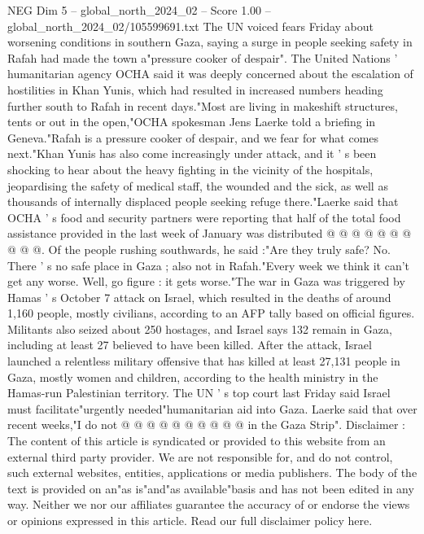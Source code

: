 \begin{textsample}{NEG Dim 5 – global\_north\_2024\_02 – Score 1.00 – global\_north\_2024\_02/105599691.txt}  \label{ex:f5_neg_217}
The UN voiced fears Friday about worsening conditions in southern Gaza, saying a surge in people seeking safety in Rafah had made the town a"pressure cooker of despair".
The United Nations ' humanitarian agency OCHA said it was deeply concerned about the escalation of hostilities in Khan Yunis, which had resulted in increased numbers heading further south to Rafah in recent days."Most are living in makeshift structures, tents or out in the open,"OCHA spokesman Jens Laerke told a briefing in Geneva."Rafah is a pressure cooker of despair, and we fear for what comes next."Khan Yunis has also come increasingly under attack, and it ' s been shocking to hear about the heavy fighting in the vicinity of the hospitals, jeopardising the safety of medical staff, the wounded and the sick, as well as thousands of internally displaced people seeking refuge there."Laerke said that OCHA ' s food and security partners were reporting that half of the total food assistance provided in the last week of January was distributed @ @ @ @ @ @ @ @ @ @.
Of the people rushing southwards, he said :"Are they truly safe?
No.
There ' s no safe place in Gaza ; also not in Rafah."Every week we think it can't get any worse.
Well, go figure : it gets worse."The war in Gaza was triggered by Hamas ' s October 7 attack on Israel, which resulted in the deaths of around 1,160 people, mostly civilians, according to an AFP tally based on official figures.
Militants also seized about 250 hostages, and Israel says 132 remain in Gaza, including at least 27 believed to have been killed.
After the attack, Israel launched a relentless military offensive that has killed at least 27,131 people in Gaza, mostly women and children, according to the health ministry in the Hamas-run Palestinian territory.
The UN ' s top court last Friday said Israel must facilitate"urgently needed"humanitarian aid into Gaza.
Laerke said that over recent weeks,"I do not @ @ @ @ @ @ @ @ @ @ in the Gaza Strip".
Disclaimer : The content of this article is syndicated or provided to this website from an external third party provider.
We are not responsible for, and do not control, such external websites, entities, applications or media publishers.
The body of the text is provided on an"as is"and"as available"basis and has not been edited in any way.
Neither we nor our affiliates guarantee the accuracy of or endorse the views or opinions expressed in this article.
Read our full disclaimer policy here.

\end{textsample}
